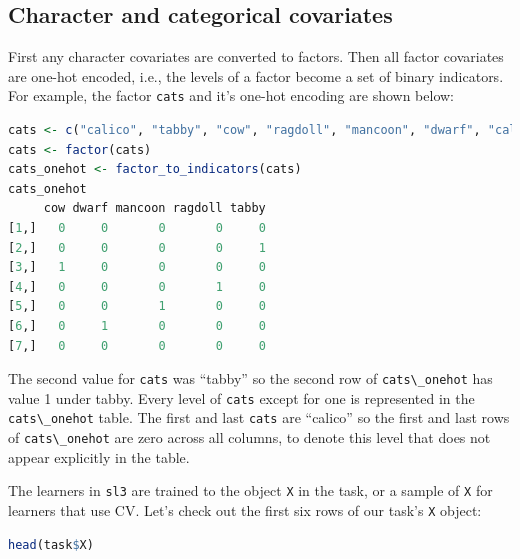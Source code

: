 \documentclass[
  12pt, krantz2,
]{krantz}
\newcommand{\passthrough}[1]{#1}
\newcommand{\1}{\mathbbm{1}}
\theoremstyle{definition}
\theoremstyle{definition}
\theoremstyle{definition}
\theoremstyle{definition}
\theoremstyle{remark}
\begin{document}
\hypertarget{character-and-categorical-covariates}{%
\subsection{Character and categorical covariates}\label{character-and-categorical-covariates}}

First any character covariates are converted to factors. Then all factor
covariates are one-hot encoded, i.e., the levels of a factor become a set of
binary indicators. For example, the factor \passthrough{\lstinline!cats!} and it's one-hot encoding are
shown below:

\begin{lstlisting}[language=R]
cats <- c("calico", "tabby", "cow", "ragdoll", "mancoon", "dwarf", "calico")
cats <- factor(cats)
cats_onehot <- factor_to_indicators(cats)
cats_onehot
     cow dwarf mancoon ragdoll tabby
[1,]   0     0       0       0     0
[2,]   0     0       0       0     1
[3,]   1     0       0       0     0
[4,]   0     0       0       1     0
[5,]   0     0       1       0     0
[6,]   0     1       0       0     0
[7,]   0     0       0       0     0
\end{lstlisting}

The second value for \passthrough{\lstinline!cats!} was ``tabby'' so the second row of \passthrough{\lstinline!cats\_onehot!} has
value 1 under tabby. Every level of \passthrough{\lstinline!cats!} except for one is represented in the
\passthrough{\lstinline!cats\_onehot!} table. The first and last \passthrough{\lstinline!cats!} are ``calico'' so the first and
last rows of \passthrough{\lstinline!cats\_onehot!} are zero across all columns, to denote this level
that does not appear explicitly in the table.

The learners in \passthrough{\lstinline!sl3!} are trained to the object \passthrough{\lstinline!X!} in the task, or a sample of
\passthrough{\lstinline!X!} for learners that use CV. Let's check out the first six rows of our task's
\passthrough{\lstinline!X!} object:

\begin{lstlisting}[language=R]
head(task$X)
\end{lstlisting}
\end{document}
